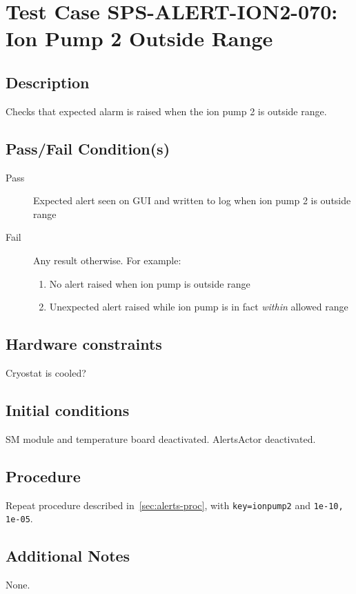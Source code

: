 \section{Test Case SPS-ALERT-ION2-070: Ion Pump 2 Outside Range}

\subsection{Description}

Checks that expected alarm is raised when the ion pump 2 is outside range.

\subsection{Pass/Fail Condition(s)}

\begin{description}
\item [Pass] Expected alert seen on GUI and written to log when ion pump 2 is outside range
\item [Fail] Any result otherwise. For example:

\begin{enumerate}
    \item No alert raised when ion pump is outside range
    \item Unexpected alert raised while ion pump is in fact {\it within} allowed range
\end{enumerate}
\end{description}

\subsection{Hardware constraints}

Cryostat is cooled?

\subsection{Initial conditions}

SM module and temperature board deactivated. AlertsActor deactivated.

\subsection{Procedure}

Repeat procedure described in~\ref{sec:alerts-proc}, with \texttt{key=ionpump2} and \texttt{1e-10, 1e-05}.

\subsection{Additional Notes}
None.
